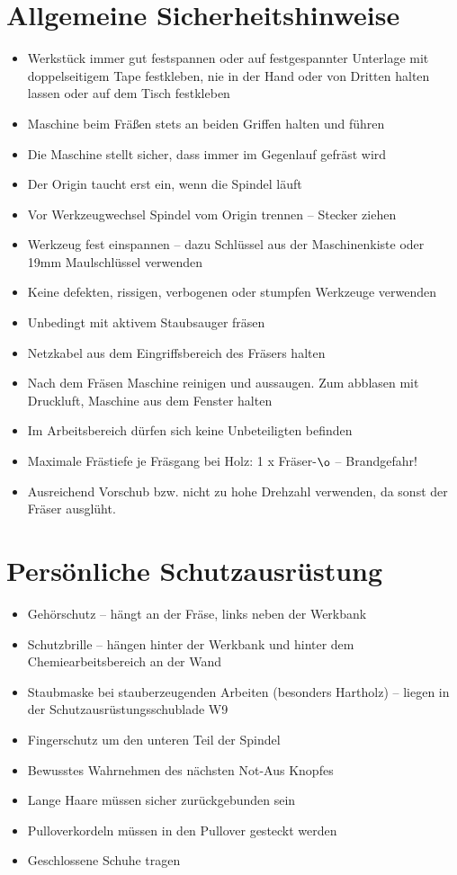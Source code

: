 \documentclass{\basedir/fablab-document}
\begin{document}
\section[Allgemeine Sicherheitshinweise]{Allgemeine Sicherheitshinweise}
\begin{itemize}
\item Werkstück immer gut festspannen oder auf festgespannter Unterlage mit doppelseitigem Tape festkleben, nie in der Hand oder von Dritten halten lassen oder auf dem Tisch festkleben
\item Maschine beim Fräßen stets an beiden Griffen halten und führen
\item Die Maschine stellt sicher, dass immer im Gegenlauf gefräst wird
\item Der Origin taucht erst ein, wenn die Spindel läuft
\item Vor Werkzeugwechsel Spindel vom Origin trennen -- Stecker ziehen
\item Werkzeug fest einspannen -- dazu Schlüssel aus der Maschinenkiste oder 19mm Maulschlüssel verwenden
\item Keine defekten, rissigen, verbogenen oder stumpfen Werkzeuge verwenden
\item Unbedingt mit aktivem Staubsauger fräsen
\item Netzkabel aus dem Eingriffsbereich des Fräsers halten
\item Nach dem Fräsen Maschine reinigen und aussaugen. Zum abblasen mit Druckluft, Maschine aus dem Fenster halten
\item Im Arbeitsbereich dürfen sich keine Unbeteiligten befinden
\item Maximale Frästiefe je Fräsgang bei Holz: 1 x Fräser-$\o$ -- Brandgefahr!
\item Ausreichend Vorschub bzw. nicht zu hohe Drehzahl verwenden, da sonst der Fräser ausglüht.
\end{itemize}


\section{Persönliche Schutzausrüstung}
\begin{itemize}
\item Gehörschutz -- hängt an der Fräse, links neben der Werkbank
\item Schutzbrille -- hängen hinter der Werkbank und hinter dem Chemiearbeitsbereich an der Wand
\item Staubmaske bei stauberzeugenden Arbeiten (besonders Hartholz) -- liegen in der Schutzausrüstungsschublade W9
\item Fingerschutz um den unteren Teil der Spindel
\item Bewusstes Wahrnehmen des nächsten Not-Aus Knopfes
\item Lange Haare müssen sicher zurückgebunden sein
\item Pulloverkordeln müssen in den Pullover gesteckt werden
\item Geschlossene Schuhe tragen
\end{itemize}
\end{document}
